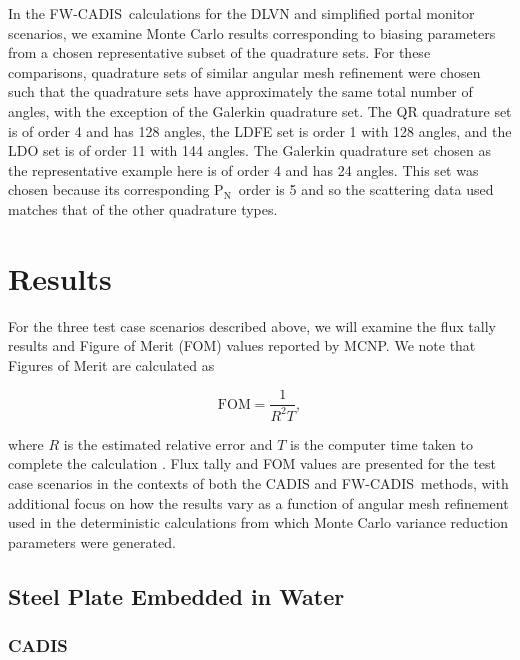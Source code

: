 \documentclass{article} %
\newcommand{\pn}{P$_\mathrm{N}$}
\newcommand{\fwc}{\mbox{FW-CADIS}}
\begin{document}
In the \fwc\ calculations for the DLVN and simplified portal monitor scenarios,
we examine Monte Carlo results corresponding to biasing parameters from a
chosen representative subset of the quadrature sets.
For these comparisons, quadrature sets of similar angular mesh
refinement were chosen such that the quadrature sets have approximately the 
same total number of angles, with the exception of the Galerkin quadrature set.
The QR quadrature set is of order 4 and has 128 angles, the LDFE set is order 1
with 128 angles, and the LDO set is of order 11 with 144 angles. 
The Galerkin quadrature set chosen as the representative example here is of
order 4 and has 24 angles. This set was chosen because its corresponding \pn\
order is 5 and so the scattering data used matches that of the other quadrature
types. 

\section{Results}
\label{sec:results}

For the three test case scenarios described above, we will examine the flux
tally results and Figure of Merit (FOM) values reported by MCNP. We note that
Figures of Merit are calculated as

\begin{equation}
\text{FOM} = \frac{1}{R^2T},
\label{eq:fom}
\end{equation}

\noindent where $R$ is the estimated relative error and $T$ is the computer
time taken to complete the calculation \cite{mcnp}. Flux tally and FOM values
are presented for the test case scenarios in the contexts of both the CADIS and
\fwc\ methods, with additional focus on how the results vary as a function of
angular mesh refinement used in the deterministic calculations from which Monte
Carlo variance reduction parameters were generated.

\subsection{Steel Plate Embedded in Water}

\subsubsection{CADIS}
\end{document}
